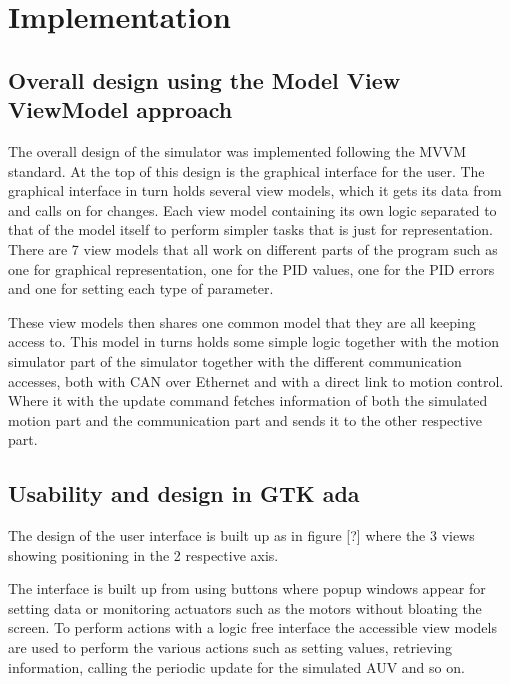 \section{Implementation}\label{sec:implementation}

\subsection{Overall design using the Model View ViewModel approach}

The overall design of the simulator was implemented following the MVVM standard. At the top of this design is the graphical interface for the user. The graphical interface in turn holds several view models, which it gets its data from and calls on for changes. Each view model containing its own logic separated to that of the model itself to perform simpler tasks that is just for representation. There are 7 view models that all work on different parts of the program such as one for graphical representation, one for the PID values, one for the PID errors and one for setting each type of parameter.

These view models then shares one common model that they are all keeping access to. This model in turns holds some simple logic together with the motion simulator part of the simulator together with the different communication accesses, both with CAN over Ethernet and with a direct link to motion control. Where it with the update command fetches information of both the simulated motion part and the communication part and sends it to the other respective part.

\subsection{Usability and design in GTK ada}
The design of the user interface is built up as in figure [?] where the 3 views showing positioning in the 2 respective axis.

The interface is built up from using buttons where popup windows appear for setting data or monitoring actuators such as the motors without bloating the screen. To perform actions with a logic free interface the accessible view models are used to perform the various actions such as setting values, retrieving information, calling the periodic update for the simulated AUV and so on.

